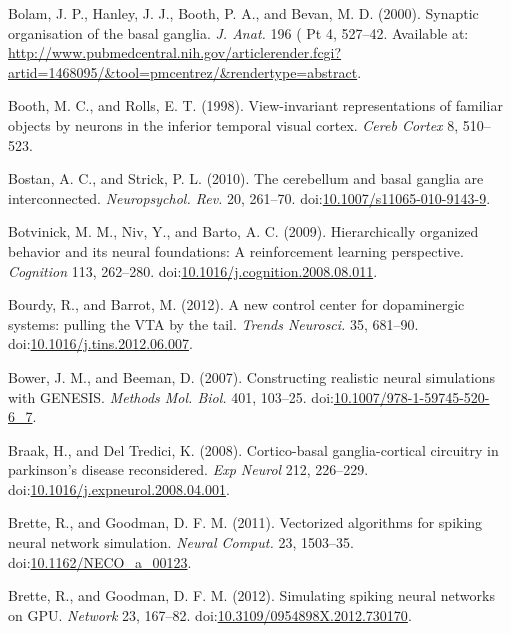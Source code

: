 \documentclass[
  11pt,
  a4paper,
]{scrbook}
\newlength{\cslhangindent}
\newenvironment{CSLReferences}[2] %
 {\begin{list}{}{%
  \setlength{\itemindent}{0pt}
  \setlength{\leftmargin}{0pt}
  \setlength{\parsep}{0pt}
  \ifodd #1
   \setlength{\leftmargin}{\cslhangindent}
   \setlength{\itemindent}{-1\cslhangindent}
  \fi
  \setlength{\itemsep}{#2\baselineskip}}}
 {\end{list}}
\begin{document}
\begin{CSLReferences}{1}{1}
Bolam, J. P., Hanley, J. J., Booth, P. A., and Bevan, M. D. (2000).
{Synaptic organisation of the basal ganglia.} \emph{J. Anat.} 196 ( Pt
4, 527--42. Available at:
\url{http://www.pubmedcentral.nih.gov/articlerender.fcgi?artid=1468095/&tool=pmcentrez/&rendertype=abstract}.

Booth, M. C., and Rolls, E. T. (1998). View-invariant representations of
familiar objects by neurons in the inferior temporal visual cortex.
\emph{Cereb Cortex} 8, 510--523.

Bostan, A. C., and Strick, P. L. (2010). {The cerebellum and basal
ganglia are interconnected.} \emph{Neuropsychol. Rev.} 20, 261--70.
doi:\href{https://doi.org/10.1007/s11065-010-9143-9}{10.1007/s11065-010-9143-9}.

Botvinick, M. M., Niv, Y., and Barto, A. C. (2009). Hierarchically
organized behavior and its neural foundations: A reinforcement learning
perspective. \emph{Cognition} 113, 262--280.
doi:\href{https://doi.org/10.1016/j.cognition.2008.08.011}{10.1016/j.cognition.2008.08.011}.

Bourdy, R., and Barrot, M. (2012). {A new control center for
dopaminergic systems: pulling the VTA by the tail.} \emph{Trends
Neurosci.} 35, 681--90.
doi:\href{https://doi.org/10.1016/j.tins.2012.06.007}{10.1016/j.tins.2012.06.007}.

Bower, J. M., and Beeman, D. (2007). {Constructing realistic neural
simulations with GENESIS.} \emph{Methods Mol. Biol.} 401, 103--25.
doi:\href{https://doi.org/10.1007/978-1-59745-520-6_7}{10.1007/978-1-59745-520-6\_7}.

Braak, H., and Del Tredici, K. (2008). Cortico-basal ganglia-cortical
circuitry in parkinson's disease reconsidered. \emph{Exp Neurol} 212,
226--229.
doi:\href{https://doi.org/10.1016/j.expneurol.2008.04.001}{10.1016/j.expneurol.2008.04.001}.

Brette, R., and Goodman, D. F. M. (2011). {Vectorized algorithms for
spiking neural network simulation.} \emph{Neural Comput.} 23, 1503--35.
doi:\href{https://doi.org/10.1162/NECO_a_00123}{10.1162/NECO\_a\_00123}.

Brette, R., and Goodman, D. F. M. (2012). {Simulating spiking neural
networks on GPU.} \emph{Network} 23, 167--82.
doi:\href{https://doi.org/10.3109/0954898X.2012.730170}{10.3109/0954898X.2012.730170}.


\end{CSLReferences}
\end{document}
